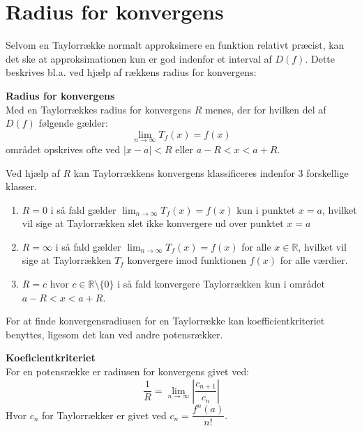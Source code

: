 \section{Radius for konvergens}
Selvom en Taylorrække normalt approksimere en funktion relativt præcist, kan det ske at
approksimationen kun er god indenfor et interval af $D(f)$. Dette beskrives bl.a. ved hjælp af rækkens
radius for konvergens:
\begin{defn} %
    \textbf{Radius for konvergens}\\
    Med en Taylorrækkes radius for konvergens $R$ menes, der for hvilken del af $D(f)$ følgende gælder:
    \[
        \lim_{n \rightarrow \infty} T_f(x) = f(x)
    \]
    området opskrives ofte ved $|x-a| < R$ eller $a - R < x < a + R$.
\end{defn}
\label{def:radiusForKonvergens}
Ved hjælp af $R$ kan Taylorrækkens konvergens klassificeres indenfor 3 forskellige klasser.
\begin{enumerate} %
    \item $R = 0$ i så fald gælder $\lim_{n \rightarrow \infty} T_f(x) = f(x)$ kun i punktet $x = a$,
    hvilket vil sige at Taylorrækken slet ikke konvergere ud over punktet $x = a$
    \item $R = \infty$ i så fald gælder $\lim_{n \rightarrow \infty} T_f(x) = f(x)$ for alle $x \in \mathbb{R}$,
    hvilket vil sige at Taylorrækken $T_f$ konvergere imod funktionen $f(x)$ for alle værdier.
    \item $R = c$ hvor $c \in \mathbb{R}\setminus\{0\}$ i så fald konvergere Taylorrækken kun i området $a - R < x < a + R$.
\end{enumerate}
For at finde konvergensradiusen for en Taylorrække kan koefficientkriteriet benyttes, ligesom det kan ved andre potensrækker.
\begin{defn} %
    \textbf{Koeficientkriteriet}\\For en potensrække er radiusen for konvergens givet ved:
    \[
        \frac{1}{R} = \lim_{n \rightarrow \infty} \left\lvert \frac{c_{n + 1}}{c_n} \right\lvert
    \]
    Hvor $c_n$ for Taylorrækker er givet ved $c_n = \dfrac{f^n(a)}{n!}$.
\end{defn} %
\label{def:koeficientKriteriet}
